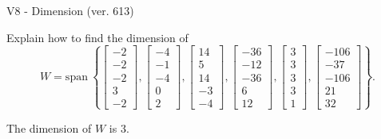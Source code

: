 \begin{exercise}
  \begin{exerciseTitle}V8 - Dimension (ver. 613)\end{exerciseTitle}
  \begin{exerciseStatement}
    Explain how to find the dimension of 
\[W=\mathrm{span}\ \left\{\left[\begin{array}{r}
-2 \\
-2 \\
-2 \\
3 \\
-2
\end{array}\right] , \left[\begin{array}{r}
-4 \\
-1 \\
-4 \\
0 \\
2
\end{array}\right] , \left[\begin{array}{r}
14 \\
5 \\
14 \\
-3 \\
-4
\end{array}\right] , \left[\begin{array}{r}
-36 \\
-12 \\
-36 \\
6 \\
12
\end{array}\right] , \left[\begin{array}{r}
3 \\
3 \\
3 \\
3 \\
1
\end{array}\right] , \left[\begin{array}{r}
-106 \\
-37 \\
-106 \\
21 \\
32
\end{array}\right]\right\}.\]



  \end{exerciseStatement}
  \begin{exerciseAnswer}
   The dimension of \(W\) is  \(3\).
  


  \end{exerciseAnswer}
\end{exercise}